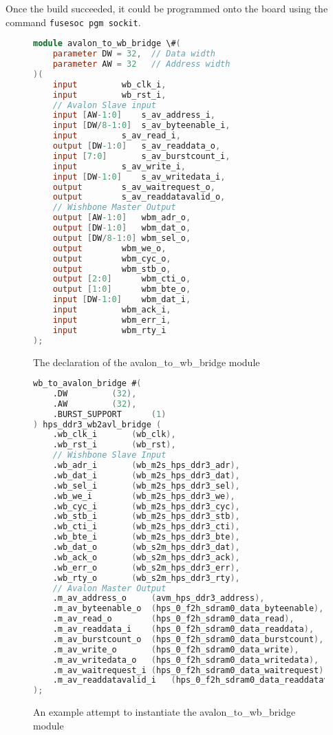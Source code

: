 Once the build succeeded, it could be programmed onto the board using the command \verb|fusesoc pgm sockit|.

\begin{figure}[t]
  \centering
  \begin{lstlisting}[language=Verilog]
module avalon_to_wb_bridge \#(
	parameter DW = 32,	// Data width
	parameter AW = 32	// Address width
)(
	input 		  wb_clk_i,
	input 		  wb_rst_i,
	// Avalon Slave input
	input [AW-1:0] 	  s_av_address_i,
	input [DW/8-1:0]  s_av_byteenable_i,
	input 		  s_av_read_i,
	output [DW-1:0]   s_av_readdata_o,
	input [7:0] 	  s_av_burstcount_i,
	input 		  s_av_write_i,
	input [DW-1:0] 	  s_av_writedata_i,
	output 		  s_av_waitrequest_o,
	output 		  s_av_readdatavalid_o,
	// Wishbone Master Output
	output [AW-1:0]   wbm_adr_o,
	output [DW-1:0]   wbm_dat_o,
	output [DW/8-1:0] wbm_sel_o,
	output 		  wbm_we_o,
	output 		  wbm_cyc_o,
	output 		  wbm_stb_o,
	output [2:0] 	  wbm_cti_o,
	output [1:0] 	  wbm_bte_o,
	input [DW-1:0] 	  wbm_dat_i,
	input 		  wbm_ack_i,
	input 		  wbm_err_i,
	input 		  wbm_rty_i
);
  \end{lstlisting}
  \caption{The declaration of the avalon\_to\_wb\_bridge module\cite{wb_dec}}
  \label{fig:wb_dec}
\end{figure}

\begin{figure}[t]
  \centering
  \begin{lstlisting}[language=Verilog]
wb_to_avalon_bridge #(
	.DW			(32),
	.AW			(32),
	.BURST_SUPPORT		(1)
) hps_ddr3_wb2avl_bridge (
	.wb_clk_i		(wb_clk),
	.wb_rst_i		(wb_rst),
	// Wishbone Slave Input
	.wb_adr_i		(wb_m2s_hps_ddr3_adr),
	.wb_dat_i		(wb_m2s_hps_ddr3_dat),
	.wb_sel_i		(wb_m2s_hps_ddr3_sel),
	.wb_we_i		(wb_m2s_hps_ddr3_we),
	.wb_cyc_i		(wb_m2s_hps_ddr3_cyc),
	.wb_stb_i		(wb_m2s_hps_ddr3_stb),
	.wb_cti_i		(wb_m2s_hps_ddr3_cti),
	.wb_bte_i		(wb_m2s_hps_ddr3_bte),
	.wb_dat_o		(wb_s2m_hps_ddr3_dat),
	.wb_ack_o		(wb_s2m_hps_ddr3_ack),
	.wb_err_o		(wb_s2m_hps_ddr3_err),
	.wb_rty_o		(wb_s2m_hps_ddr3_rty),
	// Avalon Master Output
	.m_av_address_o		(avm_hps_ddr3_address),
	.m_av_byteenable_o	(hps_0_f2h_sdram0_data_byteenable),
	.m_av_read_o		(hps_0_f2h_sdram0_data_read),
	.m_av_readdata_i	(hps_0_f2h_sdram0_data_readdata),
	.m_av_burstcount_o	(hps_0_f2h_sdram0_data_burstcount),
	.m_av_write_o		(hps_0_f2h_sdram0_data_write),
	.m_av_writedata_o	(hps_0_f2h_sdram0_data_writedata),
	.m_av_waitrequest_i	(hps_0_f2h_sdram0_data_waitrequest),
	.m_av_readdatavalid_i	(hps_0_f2h_sdram0_data_readdatavalid)
);
  \end{lstlisting}
  \caption{An example attempt to instantiate the avalon\_to\_wb\_bridge module\cite{wb_inst}}
  \label{fig:wb_inst}
\end{figure}

